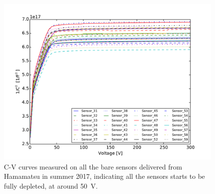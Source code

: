\documentclass[conference]{IEEEtran}
\begin{document}
\begin{figure}[!ht]%
  \centering
  \includegraphics[width=0.9\linewidth]{pics/All_sensors_CV.pdf}
  \caption{C-V curves measured on all the bare sensors delivered from Hamamatsu in summer 2017, indicating all the sensors starts to be fully depleted, at around \SI{50}{\volt}.}%
\label{fig:2}%
\end{figure}
\end{document}
